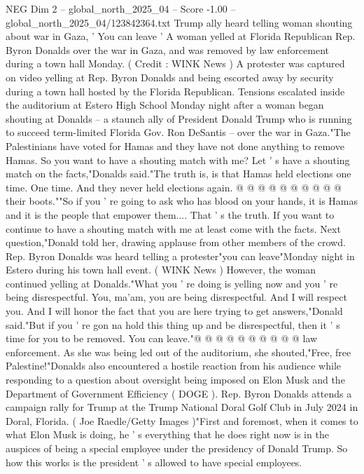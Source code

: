 \begin{textsample}{NEG Dim 2 – global\_north\_2025\_04 – Score -1.00 – global\_north\_2025\_04/123842364.txt}  \label{ex:f2_neg_119}
Trump ally heard telling woman shouting about war in Gaza, ' You can leave ' A woman yelled at Florida Republican Rep.
Byron Donalds over the war in Gaza, and was removed by law enforcement during a town hall Monday. ( Credit : WINK News ) A protester was captured on video yelling at Rep.
Byron Donalds and being escorted away by security during a town hall hosted by the Florida Republican.
Tensions escalated inside the auditorium at Estero High School Monday night after a woman began shouting at Donalds -- a staunch ally of President Donald Trump who is running to succeed term-limited Florida Gov.
Ron DeSantis -- over the war in Gaza."The Palestinians have voted for Hamas and they have not done anything to remove Hamas.
So you want to have a shouting match with me?
Let ' s have a shouting match on the facts,"Donalds said."The truth is, is that Hamas held elections one time.
One time.
And they never held elections again. @ @ @ @ @ @ @ @ @ @ their boots.""So if you ' re going to ask who has blood on your hands, it is Hamas and it is the people that empower them....
That ' s the truth.
If you want to continue to have a shouting match with me at least come with the facts.
Next question,"Donald told her, drawing applause from other members of the crowd.
Rep.
Byron Donalds was heard telling a protester"you can leave"Monday night in Estero during his town hall event. ( WINK News ) However, the woman continued yelling at Donalds."What you ' re doing is yelling now and you ' re being disrespectful.
You, ma'am, you are being disrespectful.
And I will respect you.
And I will honor the fact that you are here trying to get answers,"Donald said."But if you ' re gon na hold this thing up and be disrespectful, then it ' s time for you to be removed.
You can leave."@ @ @ @ @ @ @ @ @ @ law enforcement.
As she was being led out of the auditorium, she shouted,"Free, free Palestine!"Donalds also encountered a hostile reaction from his audience while responding to a question about oversight being imposed on Elon Musk and the Department of Government Efficiency ( DOGE ).
Rep.
Byron Donalds attends a campaign rally for Trump at the Trump National Doral Golf Club in July 2024 in Doral, Florida. ( Joe Raedle/Getty Images )"First and foremost, when it comes to what Elon Musk is doing, he ' s everything that he does right now is in the auspices of being a special employee under the presidency of Donald Trump.
So how this works is the president ' s allowed to have special employees.

\end{textsample}
